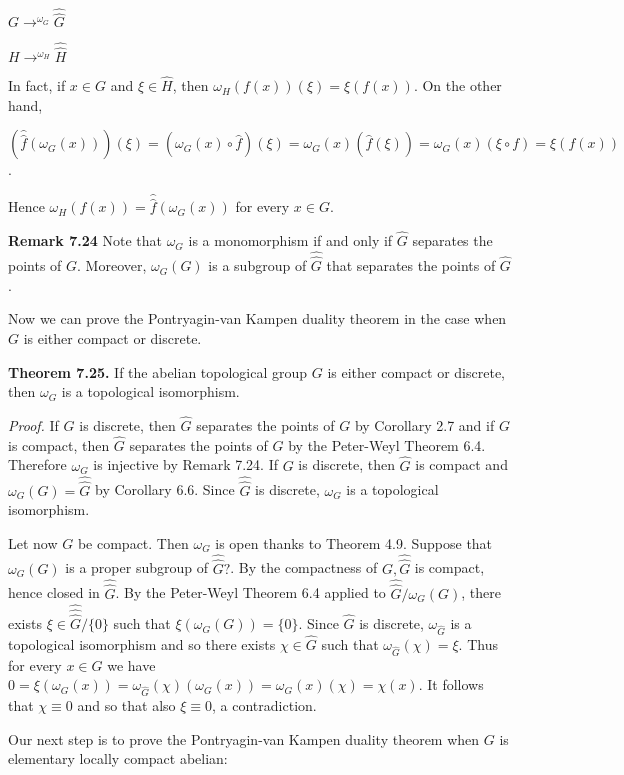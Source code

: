 \documentclass[12pt]{article}
\begin{document}
\begin{itemize}
\begin{itemize}

$G \to^{\omega_G} \hat{\hat{G}}$ 

$H \to^{\omega_H} \hat{\hat{H}}$ 


In fact, if $x \in G$ and $\xi \in \hat{H}$, then $\omega_H(f(x))(\xi) = \xi(f(x))$. On the other hand,


    $(\hat{\hat{f}}(\omega_G(x)))(\xi) = (\omega_G(x) \circ \hat{f})(ξ) = ω_G(x)(\hat{f}(\xi)) = \omega_G(x)(\xi \circ f) = \xi(f(x))$.


Hence $\omega_H(f(x)) = \hat{\hat{f}}(\omega_G(x))$ for every $x \in G$.


\textbf{Remark 7.24}  Note that $\omega_G$ is a monomorphism if and only if $\hat{G}$ separates the points of $G$. Moreover, $\omega_G(G)$
is a subgroup of $\hat{\hat{G}}$ that separates the points of $\hat{G}$.


    Now we can prove the Pontryagin-van Kampen duality theorem in the case when $G$ is either compact or
discrete.


\textbf{Theorem 7.25.} If the abelian topological group $G$ is either compact or discrete, then $\omega_G$ is a topological
isomorphism.


\emph{Proof.} If $G$ is discrete, then $\hat{G}$ separates the points of $G$ by Corollary 2.7 and if $G$ is compact, then $\hat{G}$ separates
the points of $G$ by the Peter-Weyl Theorem 6.4. Therefore $\omega_G$ is injective by Remark 7.24. If $G$ is discrete,
then $\hat{G}$ is compact and $\omega_G(G) = \hat{\hat{G}}$ by Corollary 6.6. Since $\hat{\hat{G}}$ is discrete, $\omega_G$ is a topological isomorphism.


    Let now $G$ be compact. Then $\omega_G$ is open thanks to Theorem 4.9. Suppose that $\omega_G(G)$ is a proper subgroup
of $\hat{\hat{G}}?$. By the compactness of $G, \hat{\hat{G}}$ is compact, hence closed in $\hat{\hat{G}}$. By the Peter-Weyl Theorem 6.4 applied
to $\hat{\hat{G}}/\omega_G(G)$, there exists $\xi \in \hat{\hat{\hat{G}}} / \{0\}$ such that $\xi(\omega_G(G)) = \{0\}$. Since $\hat{G}$ is discrete, $\omega_{\hat{G}}$ is a topological
isomorphism and so there exists $\chi \in \hat{G}$ such that $\omega_{\hat{G}}(\chi) = \xi$. Thus for every $x \in G$ we have
$0 = \xi(\omega_G(x)) = \omega_{\hat{G}}(\chi)(\omega_G(x)) = \omega_G(x)(\chi) = \chi(x)$. It follows that $\chi ≡ 0$ and so that also $\xi ≡ 0$, a contradiction.


    Our next step is to prove the Pontryagin-van Kampen duality theorem when $G$ is elementary locally compact
abelian:



\end{itemize}
\end{itemize}
\end{document}
